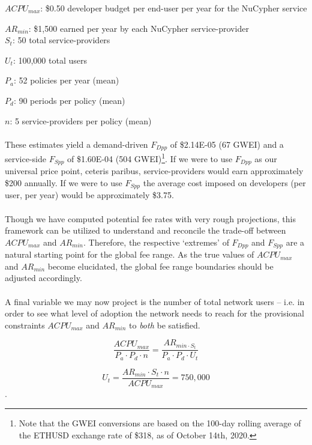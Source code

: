 \documentclass[longbibliography,nofootinbib]{revtex4-1}
\begin{document}
$ACPU_{max}$: \$0.50 developer budget per end-user per year for the NuCypher service

$AR_{min}$: \$1,500 earned per year by each NuCypher service-provider
\\

$S_t$: 50 total service-providers

$U_t$: 100,000 total users

$P_a$: 52 policies per year (mean)

$P_d$: 90 periods per policy (mean)

$n$: 5 service-providers per policy (mean)
\\\\
These estimates yield a demand-driven $F_{Dpp}$ of \$2.14E-05 (67 GWEI) and a service-side $F_{Spp}$ of \$1.60E-04 (504 GWEI)\footnote{Note that the GWEI conversions are based on the 100-day rolling average of the ETHUSD exchange rate of \$318, as of October 14th, 2020.}. If we were to use $F_{Dpp}$ as our universal price point, ceteris paribus, service-providers would earn approximately \$200 annually. If we were to use $F_{Spp}$ the average cost imposed on developers (per user, per year) would be approximately \$3.75. 
\\\\
Though we have computed potential fee rates with very rough projections, this framework can be utilized to understand and reconcile the trade-off between $ACPU_{max}$ and $AR_{min}$. Therefore, the respective `extremes' of $F_{Dpp}$ and $F_{Spp}$ are a natural starting point for the global fee range. As the true values of $ACPU_{max}$ and $AR_{min}$ become elucidated, the global fee range boundaries should be adjusted accordingly. 
\\\\
A final variable we may now project is the number of total network users – i.e. in order to see what level of adoption the network needs to reach for the provisional constraints $ACPU_{max}$ and $AR_{min}$ to \textit{both} be satisfied.

\begin{equation}
     \frac{ACPU_{max}}{P_a \cdot P_d \cdot n} = \frac{AR_{min \cdot S_t}}{P_a \cdot P_d \cdot U_t}
\end{equation}

\begin{equation}
     U_t = \frac{AR_{min} \cdot S_t \cdot n}{ACPU_{max}} = 750,000 
\end{equation}. \\
\end{document}
